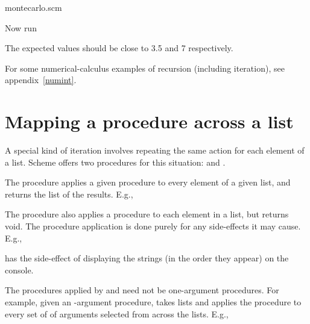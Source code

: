 \scmfilename montecarlo.scm


\n Now run


\n The expected values should be close to 3.5 and 7 respectively.

For some numerical-calculus examples of recursion (including iteration),
see appendix~\ref{numint}.


\section{Mapping a procedure across a list}

A special kind of iteration involves repeating the same
action for each element of a list.  Scheme offers two
procedures for this situation:  and .

The  procedure applies a given procedure to every
element of a given list, and returns the list of the
results.  E.g.,


The  procedure also applies a procedure to each
element in a list, but returns void.  The procedure
application is done purely for any side-effects it may
cause.  E.g.,


\n has the side-effect of displaying the strings (in
  the order they appear) on the console.

The procedures applied by  and 
need not be one-argument procedures.  For example,
given an -argument procedure, 
takes  lists and applies the procedure to
every set of  of arguments selected from across
the lists.  E.g.,

